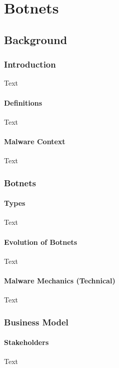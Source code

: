 \chapter{Botnets}


\newpage

\minitoc %

\newpage

\section{Background}
	\subsection{Introduction}
		Text	
		\subsubsection{Definitions}
		Text
		\subsubsection{Malware Context}
		Text
	\subsection{Botnets}
		\subsubsection{Types}
			Text
		\subsubsection{Evolution of Botnets}
			Text
		\subsubsection{Malware Mechanics (Technical)}
			Text				
	\subsection{Business Model}
		\subsubsection{Stakeholders}
			Text
